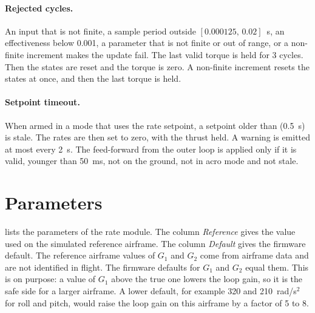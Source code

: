 \paragraph{Rejected cycles.}
An input that is not finite, a sample period outside $[0.000125,\,0.02]$~s, an effectiveness below 0.001, a parameter that is not finite or out of range, or a non-finite increment makes the update fail.
The last valid torque is held for 3 cycles.
Then the states are reset and the torque is zero.
A non-finite increment resets the states at once, and then the last torque is held.

\paragraph{Setpoint timeout.}
When armed in a mode that uses the rate setpoint, a setpoint older than  (0.5~s) is stale.
The rates are then set to zero, with the thrust held.
A warning is emitted at most every 2~s.
The feed-forward from the outer loop is applied only if it is valid, younger than 50~ms, not on the ground, not in acro mode and not stale.

\section{Parameters}\label{sec:inner_params}

 lists the parameters of the rate module.
The column \emph{Reference} gives the value used on the simulated reference airframe.
The column \emph{Default} gives the firmware default.
The reference airframe values of $G_1$ and $G_2$ come from airframe data and are not identified in flight.
The firmware defaults for $G_1$ and $G_2$ equal them.
This is on purpose: a value of $G_1$ above the true one lowers the loop gain, so it is the safe side for a larger airframe.
A lower default, for example 320 and 210~rad/s$^2$ for roll and pitch, would raise the loop gain on this airframe by a factor of 5 to 8.

